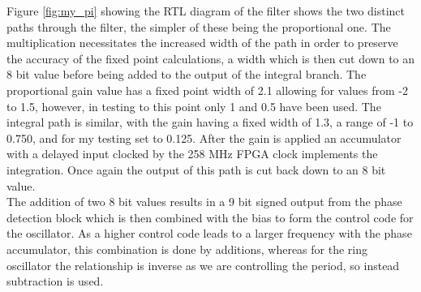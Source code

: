 \documentclass[11pt,english,british]{report}
\begin{document}
Figure \ref{fig:my_pi} showing the RTL diagram of the filter shows the two distinct paths through the filter, the simpler of these being the proportional one. The multiplication necessitates the increased width of the path in order to preserve the accuracy of the fixed point calculations, a width which is then cut down to an 8 bit value before being added to the output of the integral branch. The proportional gain value has a fixed point width of 2.1 allowing for values from -2 to 1.5, however, in testing to this point only 1 and 0.5 have been used. The integral path is similar, with the gain having a fixed width of 1.3, a range of -1 to 0.750, and for my testing set to 0.125. After the gain is applied an accumulator with a delayed input clocked by the 258 MHz FPGA clock implements the integration. Once again the output of this path is cut back down to an 8 bit value.\\
The addition of two 8 bit values results in a 9 bit signed output from the phase detection block which is then combined with the bias to form the control code for the oscillator. As a higher control code leads to a larger frequency with the phase accumulator, this combination is done by additions, whereas for the ring oscillator the relationship is inverse as we are controlling the period, so instead subtraction is used.
\end{document}
